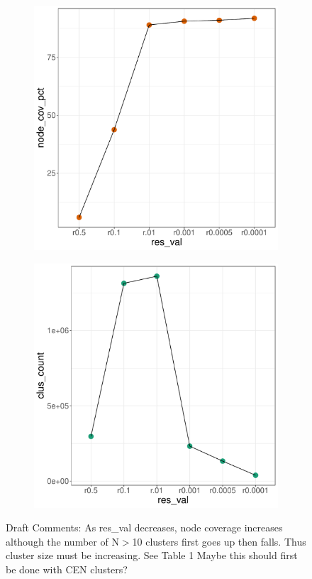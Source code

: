 \documentclass[12pt, oneside]{article}   	%
\begin{document}
	
\begin{figure}[H]
\centering
\begin{subfigure}[t]{0.48\textwidth}
\centering
\includegraphics[width=\linewidth]{node_cov.pdf}
\end{subfigure}
\hfill
\begin{subfigure}[t]{0.48\textwidth}
\centering
\includegraphics[width=\linewidth]{clus_count.pdf} 
\end{subfigure}
\captionsetup{width=0.9\textwidth}
\caption{Draft Comments: As res\_val decreases, node coverage increases although the number of N$>$10 clusters first goes up then falls. Thus cluster size must be increasing. See Table 1 Maybe this should first be done with CEN clusters?
}
\label{fig:overlapping}
\end{figure}
\end{document}
